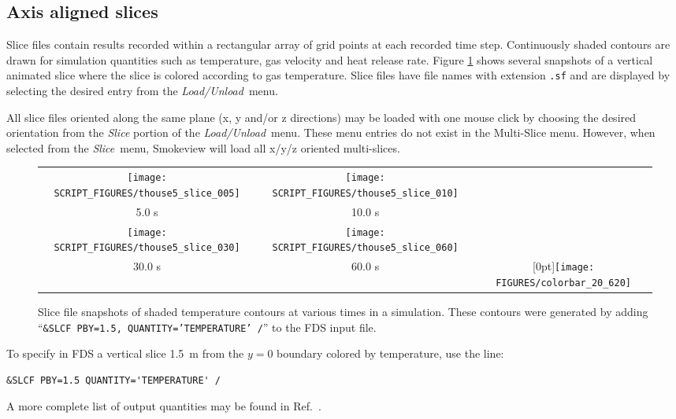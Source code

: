 \documentclass[11pt,twoside]{book}
\begin{document}
\subsection{Axis aligned slices}

Slice files contain results recorded within a rectangular array of
grid points at each recorded time step. Continuously shaded
contours are drawn for simulation quantities such as temperature,
gas velocity and heat release rate. Figure \ref{figslice} shows
several snapshots of a vertical animated slice where the slice is
colored according to gas temperature. Slice files have file names
with extension {\tt .sf} and are displayed by selecting the
desired entry from the {\em Load/Unload}\ menu.

All slice files oriented along the same plane (x, y and/or z directions) may be loaded
with one mouse click by choosing the desired orientation from the {\em Slice}
portion of the {\em Load/Unload}\ menu.  These menu entries do not exist in the Multi-Slice menu.
However, when selected from the {\em Slice}\ menu, Smokeview will load all x/y/z oriented multi-slices.


\begin{figure}[\figoptions]
\begin{center}
\begin{tabular}{ccc}
\texttt{[image: SCRIPT\_FIGURES/thouse5\_slice\_005]}&
\texttt{[image: SCRIPT\_FIGURES/thouse5\_slice\_010]}\\
5.0 s&10.0 s\\
\texttt{[image: SCRIPT\_FIGURES/thouse5\_slice\_030]}&
\texttt{[image: SCRIPT\_FIGURES/thouse5\_slice\_060]}&\\
30.0 s&60.0 s
&\raisebox{0.0ex}[0pt]{\texttt{[image: FIGURES/colorbar\_20\_620]}}\\
\end{tabular}
\caption [Slice file snapshots of shaded temperature contours.]
{Slice file snapshots of shaded temperature contours at various
times in a simulation. These contours were generated by adding
``{\tt \&SLCF PBY=1.5, QUANTITY='TEMPERATURE' /}'' to the FDS
input file. }
\label{figslice}%
\end{center}
\end{figure}

\indent To specify in FDS a vertical slice 1.5~m from the $y=0$
boundary colored by temperature, use the line:
\begin{lstlisting}[basicstyle=\ttfamily]
&SLCF PBY=1.5 QUANTITY='TEMPERATURE' /
\end{lstlisting}
A more complete list of output quantities may be found in
Ref.~\cite{FDS_Users_Guide}.
\end{document}
